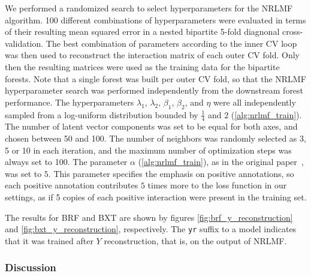 We performed a randomized search to select hyperparameters for the NRLMF algorithm. 100 different combinations of hyperparameters were evaluated
in terms of their resulting mean squared error in a nested bipartite 5-fold diagnonal cross-validation.
The best combination of parameters according to the inner CV loop was then used to reconstruct the interaction matrix of each outer CV fold. Only then the resulting matrices were used as the training data for the bipartite forests. Note that a single forest was built per outer CV fold, so that the NRLMF hyperparameter search was performed independently from the downstream forest performance.
The hyperparameters $\lambda_1$, $\lambda_2$, $\beta_1$, $\beta_2$, and $\eta$ were all independently sampled from a log-uniform distribution bounded by $\frac{1}{4}$ and $2$ (\autoref{alg:nrlmf_train}).
The number of latent vector components was set to be equal for both axes, and chosen between 50 and 100. The number of neighbors was randomly selected as 3, 5 or 10 in each iteration, and the maximum number of optimization steps was always set to 100. The parameter $\alpha$ (\autoref{alg:nrlmf_train}), as in the original paper~\cite{liu2016neighborhood}, was set to $5$. This parameter specifies the emphasis on positive annotations, so each positive annotation contributes $5$ times more to the loss function in our settings, as if 5 copies of each positive interaction were present in the training set.
%

The results for BRF and BXT are shown by figures \ref{fig:brf_y_reconstruction} and \ref{fig:bxt_y_reconstruction}, respectively. The \texttt{yr} suffix to a model indicates that it was trained after $Y$ reconstruction, that is, on the output of NRLMF.


\subsubsection{Discussion}

